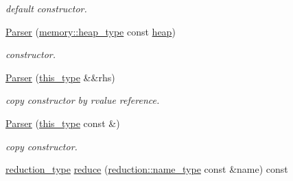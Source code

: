 \begin{DoxyCompactItemize}
\begin{DoxyCompactList}\small\item\em default constructor. \end{DoxyCompactList}\item 
\hypertarget{classhryky_1_1uri_1_1_parser_ac551f5b37c3388b1cccfeb3b01aa064f}{\hyperlink{classhryky_1_1uri_1_1_parser_ac551f5b37c3388b1cccfeb3b01aa064f}{Parser} (\hyperlink{classhryky_1_1memory_1_1heap_1_1_base}{memory\-::heap\-\_\-type} const \hyperlink{classhryky_1_1parser_1_1_base_ade0723cedb648d9850423cc04fe4bdcf}{heap})}\label{classhryky_1_1uri_1_1_parser_ac551f5b37c3388b1cccfeb3b01aa064f}

\begin{DoxyCompactList}\small\item\em constructor. \end{DoxyCompactList}\item 
\hypertarget{classhryky_1_1uri_1_1_parser_a90e5c72ae8c0f0e26dcbf59f4c9de9c5}{\hyperlink{classhryky_1_1uri_1_1_parser_a90e5c72ae8c0f0e26dcbf59f4c9de9c5}{Parser} (\hyperlink{classhryky_1_1uri_1_1_parser_ab16d652331f3a9386278bacd77c167ec}{this\-\_\-type} \&\&rhs)}\label{classhryky_1_1uri_1_1_parser_a90e5c72ae8c0f0e26dcbf59f4c9de9c5}

\begin{DoxyCompactList}\small\item\em copy constructor by rvalue reference. \end{DoxyCompactList}\item 
\hypertarget{classhryky_1_1uri_1_1_parser_afbc5b7d527f6318f807e0e31ffb774c0}{\hyperlink{classhryky_1_1uri_1_1_parser_afbc5b7d527f6318f807e0e31ffb774c0}{Parser} (\hyperlink{classhryky_1_1uri_1_1_parser_ab16d652331f3a9386278bacd77c167ec}{this\-\_\-type} const \&)}\label{classhryky_1_1uri_1_1_parser_afbc5b7d527f6318f807e0e31ffb774c0}

\begin{DoxyCompactList}\small\item\em copy constructor. \end{DoxyCompactList}\item 
\hypertarget{classhryky_1_1uri_1_1_parser_a2b5bd16ebaf2c7392d594d01b704aa45}{\hyperlink{namespacehryky_a343a9a4c36a586be5c2693156200eadc}{reduction\-\_\-type} \hyperlink{classhryky_1_1uri_1_1_parser_a2b5bd16ebaf2c7392d594d01b704aa45}{reduce} (\hyperlink{namespacehryky_1_1reduction_ac686c30a4c8d196bbd0f05629a6b921f}{reduction\-::name\-\_\-type} const \&name) const }\label{classhryky_1_1uri_1_1_parser_a2b5bd16ebaf2c7392d594d01b704aa45}


\end{DoxyCompactItemize}
